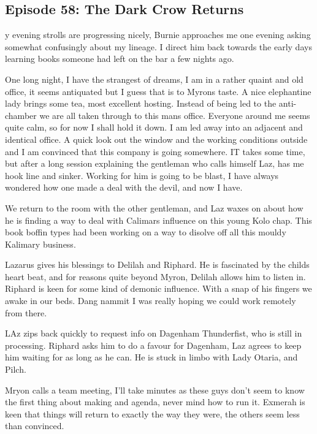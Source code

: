 \subsection{Episode 58: The Dark Crow Returns}

y evening strolls are progressing nicely, Burnie approaches me one evening asking somewhat confusingly about my lineage. I direct him back towards the early days learning books someone had left on the bar a few nights ago.\medskip

One long night, I have the strangest of dreams, I am in a rather quaint and old office, it seems antiquated but I guess that is to Myrons taste. A nice elephantine lady brings some tea, most excellent hosting. Instead of being led to the anti-chamber we are all taken through to this mans office. Everyone around me seems quite calm, so for now I shall hold it down. I am led away into an adjacent and identical office. A quick look out the window and the working conditions outside and I am convinced that this company is going somewhere. IT takes some time, but after a long session explaining the gentleman who calls himself Laz, has me hook line and sinker. Working for him is going to be blast, I have always wondered how one made a deal with the devil, and now I have.\medskip

We return to the room with the other gentleman, and Laz waxes on about how he is finding a way to deal with Calimars influence on this young Kolo chap. This book boffin types had been working on a way to disolve off all this mouldy Kalimary business.\medskip

Lazarus gives his blessings to Delilah and Riphard. He is fascinated by the childs heart beat, and for reasons quite beyond Myron, Delilah allows him to listen in. Riphard is keen for some kind of demonic influence. With a snap of his fingers we awake in our beds. Dang nammit I was really hoping we could work remotely from there.\medskip

LAz zips back quickly to request info on Dagenham Thunderfist, who is still in processing. Riphard asks him to do a favour for Dagenham, Laz agrees to keep him waiting for as long as he can. He is stuck in limbo with Lady Otaria, and Pilch.\medskip

Mryon calls a team meeting, I'll take minutes as these guys don't seem to know the first thing about making and agenda, never mind how to run it. Exmerah is keen that things will return to exactly the way they were, the others seem less than convinced.\medskip

